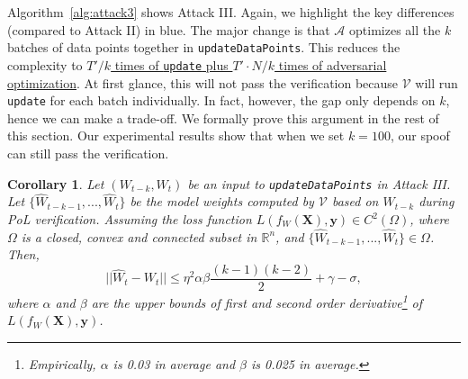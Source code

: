 \documentclass[conference]{IEEEtran}
\newtheorem{corollary}{Corollary}
\newcommand{\Verif}{\mathcal{V}\xspace}
\newcommand{\Adv}{\mathcal{A}\xspace}
\begin{document}
Algorithm~\ref{alg:attack3} shows Attack III. Again, we highlight the key differences (compared to Attack II) in blue. 
The major change is that $\Adv$ optimizes all the $k$ batches of data points  together in \texttt{updateDataPoints}.
This reduces the complexity to \ul{$T'/k$ times of \texttt{update} plus $T'\cdot N /k$ times of adversarial optimization}.
At first glance, this will not pass the verification because $\Verif$ will run \texttt{update} for each batch individually. 
In fact, however, the gap only {depends\EndAccSupp{}} on $k$, hence we can make a trade-off. 
We formally prove this argument in the rest of this section.
Our experimental results show that when we set  $k=100$, our {spoof\EndAccSupp{}} can still pass the verification. 



 
\begin{corollary}
Let $(W_{t-k}, W_t)$ be an {input\EndAccSupp{}} to \texttt{updateDataPoints} in Attack III.
Let $\{\hat{W}_{t-k-1},...,\hat{W}_{t}\}$ be the model weights computed by $\Verif$ {based\EndAccSupp{}} on $W_{t-k}$ during PoL verification. 
Assuming the loss function $L(f_{W}(\mathbf{X}),\mathbf{y}) \in C^2(\Omega)$, where $\Omega$ is a closed, convex and connected subset in $\mathbb{R}^n$, and $\{\hat{W}_{t-k-1},...,\hat{W}_{t}\} \in \Omega$. Then, 
$$||\hat{W}_t-W_t||\leq \eta^2\alpha\beta \frac{(k-1)(k-2)}{2} + \gamma - \sigma,$$
where $\alpha$ and $\beta$ are the upper bounds of first and second order derivative\footnote{Empirically, $\alpha$ is 0.03 in average and $\beta$ is 0.025 in average.} of $L(f_{W}(\mathbf{X}),\mathbf{y})$.
\end{corollary}
\end{document}
